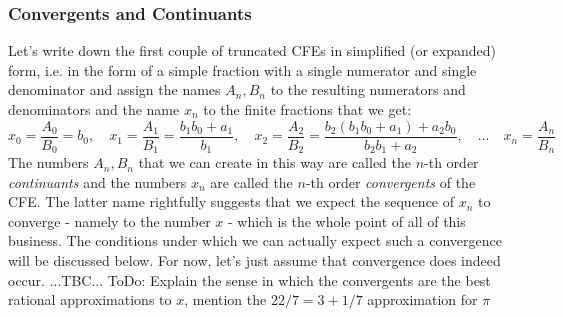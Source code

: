 \subsubsection{Convergents and Continuants}
Let's write down the first couple of truncated CFEs in simplified (or expanded) form, i.e. in the form of a simple fraction with a single numerator and single denominator and assign the names $A_n, B_n$ to the resulting numerators and denominators and the name $x_n$ to the finite fractions that we get:
\begin{equation}
\label{Eq:ContinuantsAndConvergents}
x_0 = \frac{A_0}{B_0} = b_0, \quad
x_1 = \frac{A_1}{B_1} = \frac{b_1 b_0 + a_1}{b_1}, \quad
x_2 = \frac{A_2}{B_2} = \frac{b_2(b_1 b_0 + a_1) + a_2 b_0}{b_2 b_1 + a_2}, \quad
\ldots \quad
x_n = \frac{A_n}{B_n}
\end{equation}
The numbers $A_n, B_n$ that we can create in this way are called the $n$-th order \emph{continuants} and the numbers $x_n$ are called the $n$-th order \emph{convergents} of the CFE. The latter name rightfully suggests that we expect the sequence of $x_n$ to converge - namely to the number $x$ - which is the whole point of all of this business. The conditions under which we can actually expect such a convergence will be discussed below. For now, let's just assume that convergence does indeed occur. ...TBC... ToDo: Explain the sense in which the convergents are the best rational approximations to $x$, mention the $22/7 = 3 + 
1/7$ approximation for $\pi$






